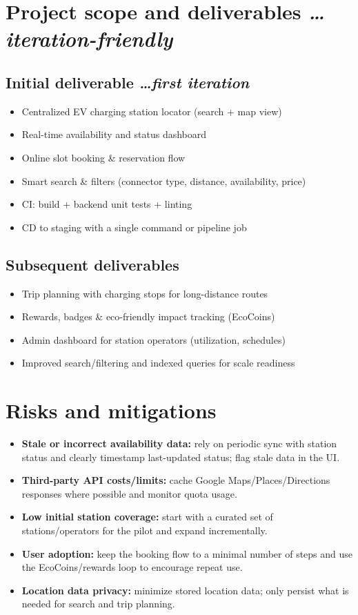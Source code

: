 \documentclass[11pt,a4paper]{article}
\newcommand{\BvrHint}[1]{%
  {\normalfont\normalsize\itshape\hfill #1}}
\begin{document}
\section{Project scope and deliverables %
\BvrHint{\ldots iteration-friendly}}
\subsection{Initial deliverable %
\BvrHint{\ldots first iteration}}
\begin{itemize}[leftmargin=0.7cm]
    \item Centralized EV charging station locator (search + map view)
    \item Real-time availability and status dashboard
    \item Online slot booking \& reservation flow
    \item Smart search \& filters (connector type, distance, availability, price)
    \item CI: build + backend unit tests + linting
    \item CD to staging with a single command or pipeline job
\end{itemize}

\subsection{Subsequent deliverables}
\begin{itemize}[leftmargin=0.7cm]
    \item Trip planning with charging stops for long-distance routes
    \item Rewards, badges \& eco-friendly impact tracking (EcoCoins)
    \item Admin dashboard for station operators (utilization, schedules)
    \item Improved search/filtering and indexed queries for scale readiness
\end{itemize}

\section{Risks and mitigations}
\begin{itemize}[leftmargin=0.7cm]
    \item \textbf{Stale or incorrect availability data:} rely on periodic sync with station status and clearly timestamp last-updated status; flag stale data in the UI.
    \item \textbf{Third-party API costs/limits:} cache Google Maps/Places/Directions responses where possible and monitor quota usage.
    \item \textbf{Low initial station coverage:} start with a curated set of stations/operators for the pilot and expand incrementally.
    \item \textbf{User adoption:} keep the booking flow to a minimal number of steps and use the EcoCoins/rewards loop to encourage repeat use.
    \item \textbf{Location data privacy:} minimize stored location data; only persist what is needed for search and trip planning.
\end{itemize}
\end{document}
